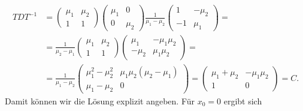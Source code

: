 \documentclass[english, parskip=full]{scrartcl}
\begin{document}
\begin{align}
TDT^{-1} &= \begin{pmatrix}
\mu_1 & \mu_2 \\ 1 & 1
\end{pmatrix} \begin{pmatrix}
\mu_1 & 0 \\ 0 & \mu_2
\end{pmatrix} \frac{1}{\mu_1 - \mu_2} \begin{pmatrix}
1 & -\mu_2 \\ -1 & \mu_1
\end{pmatrix} = \\
&= \frac{1}{\mu_2 - \mu_1} \begin{pmatrix}
\mu_1 & \mu_2 \\ 1 & 1
\end{pmatrix} \begin{pmatrix}
\mu_1 & -\mu_1\mu_2 \\ -\mu_2 & \mu_1\mu_2
\end{pmatrix} = \\
&= \frac{1}{\mu_1 - \mu_2} \begin{pmatrix}
\mu_1^2 - \mu_2^2 & \mu_1\mu_2(\mu_2 - \mu_1) \\
\mu_1 - \mu_2 & 0
\end{pmatrix} = \begin{pmatrix}
\mu_1 + \mu_2 & -\mu_1\mu_2 \\ 1 & 0
\end{pmatrix} = C.
\end{align}
Damit können wir die Lösung explizit angeben.
Für $x_0=0$ ergibt sich
\end{document}
